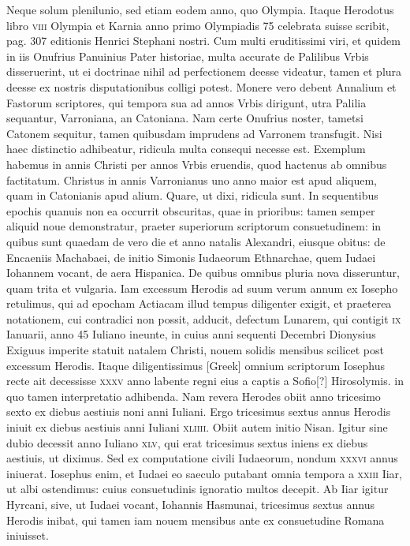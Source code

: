 Neque solum plenilunio, sed etiam eodem anno, quo
Olympia.
Itaque Herodotus libro \textsc{viii} Olympia et Karnia anno primo
Olympiadis 75 celebrata suisse scribit, pag. 307 editionis Henrici
Stephani nostri.
Cum multi eruditissimi viri, et quidem in iis
Onufrius Panuinius Pater historiae, multa accurate de Palilibus Vrbis
disseruerint, ut ei doctrinae nihil ad perfectionem deesse videatur,
tamen et plura deesse ex nostris disputationibus colligi potest.
Monere vero debent Annalium et Fastorum scriptores, qui tempora
sua ad annos Vrbis dirigunt, utra Palilia sequantur, Varroniana,
an Catoniana.
Nam certe Onufrius noster, tametsi Catonem sequitur,
tamen quibusdam imprudens ad Varronem transfugit.
Nisi
haec distinctio adhibeatur, ridicula multa consequi necesse est.
Exemplum habemus in annis Christi per annos Vrbis eruendis,
quod hactenus ab omnibus factitatum.
Christus in annis Varronianus
uno anno maior est apud aliquem, quam in Catonianis apud alium.
Quare, ut dixi, ridicula sunt.
In sequentibus epochis quanuis
non ea occurrit obscuritas, quae in prioribus: tamen semper aliquid
noue demonstratur, praeter superiorum scriptorum consuetudinem:
in quibus sunt quaedam de vero die et anno natalis Alexandri, eiusque
obitus: de Encaeniis Machabaei, de initio Simonis Iudaeorum
Ethnarchae, quem Iudaei Iohannem vocant, de aera Hispanica.
De quibus omnibus pluria nova disseruntur, quam trita et vulgaria.
Iam
excessum Herodis ad suum verum annum ex Iosepho retulimus,
qui ad epocham Actiacam illud tempus diligenter exigit, et praeterea
notationem, cui contradici non possit, adducit, defectum Lunarem,
qui contigit \textsc{ix} Ianuarii, anno 45 Iuliano ineunte, in cuius
anni sequenti Decembri Dionysius Exiguus imperite statuit natalem
Christi, nouem solidis mensibus scilicet post excessum Herodis.
Itaque diligentissimus \textgreek{[Greek]} omnium scriptorum Iosephus
recte ait decessisse \textsc{xxxv} anno labente regni eius a captis a Sofio[?]
Hirosolymis. in quo tamen interpretatio adhibenda.
Nam revera Herodes
obiit anno tricesimo sexto ex diebus aestiuis noni anni Iuliani.
Ergo tricesimus sextus annus Herodis iniuit ex diebus aestiuis anni
Iuliani \textsc{xliiii}.
Obiit autem initio Nisan.
Igitur sine dubio decessit
anno Iuliano \textsc{xlv}, qui erat tricesimus sextus iniens ex diebus aestiuis,
ut diximus.
Sed ex computatione civili Iudaeorum, nondum
\textsc{xxxvi} annus iniuerat.
Iosephus enim, et Iudaei eo saeculo putabant
omnia tempora a \textsc{xxiii} Iiar, ut albi ostendimus: cuius consuetudinis
ignoratio multos decepit.
Ab Iiar igitur Hyrcani, sive, ut Iudaei
vocant, Iohannis Hasmunai, tricesimus sextus annus Herodis inibat,
qui tamen iam nouem mensibus ante ex consuetudine Romana iniuisset.

